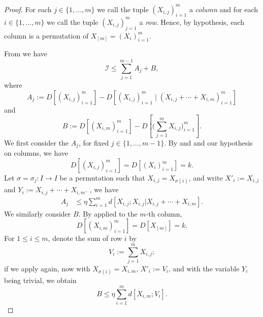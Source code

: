 \begin{proof}
  For each $j \in \{1,\dots,m\}$ we call the tuple $(X_{i,j})_{i = 1}^m$ a \emph{column} and for each $i \in \{1,\dots, m\}$ we call the tuple $(X_{i,j})_{j = 1}^m$ a \emph{row}. Hence, by hypothesis, each column is a permutation of $X_{[m]} = (X_i)_{i=1}^m$.

From  we have
\begin{equation}\label{441} {\mathcal I} \leq \sum_{j=1}^{m-1} A_j + B,\end{equation}
where
\[
  A_j := D[ (X_{i, j})_{i = 1}^m] - D[ (X_{i, j})_{i = 1}^m  \; \big| \; (X_{i,j} + \cdots + X_{i,m})_{i =1}^m  ]
\]
and
\[
  B := D[ (X_{i,m})_{i=1}^m ] - D[ \bigl(\sum_{j=1}^m X_{i,j}\bigr)_{i=1}^m ].
\]
We first consider the $A_j$, for fixed $j \in \{1,\dots, m-1\}$.
By  and and our hypothesis on columns, we have
\[
  D[ (X_{i, j})_{i = 1}^m ]= D[ (X_i)_{i=1}^m ] = k.
\]
Let $\sigma = \sigma_j \colon I \to I$ be a permutation such that $X_{i,j} = X_{\sigma(i)}$, and write $X'_i := X_{i,j}$ and $Y_i := X_{i,j} + \cdots + X_{i,m}$.
, we have
\begin{align}
  A_j & \leq \eta \sum_{i = 1}^m d[X_{i,j}; X_{i, j}|X_{i, j} + \cdots + X_{i,m}].\label{54a}
\end{align}
We similarly consider $B$.  By  applied to the $m$-th column,
\[
  D[ (X_{i, m})_{i = 1}^m ] = D[X_{[m]}] = k.
\]
For $1 \leq i \leq m$, denote the sum of row $i$ by
\[
  V_i := \sum_{j=1}^m X_{i,j};
\]
if we apply  again, now with $X_{\sigma(i)} = X_{i,m}$, $X'_i := V_i$, and with the variable $Y_i$ being trivial, we obtain
\begin{equation}\label{55a}
  B \leq \eta \sum_{i = 1}^m d[X_{i,m}; V_i].
\end{equation}


\end{proof}
